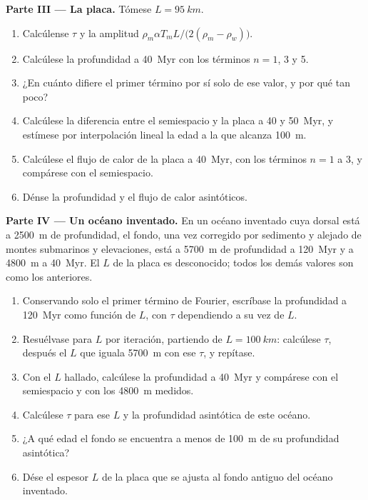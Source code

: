 \begin{problem}
\medskip\noindent\textbf{Parte III --- La placa.} Tómese $L = \qty{95}{km}$.
\begin{enumerate}[resume]
  \item Calcúlense $\tau$ y la amplitud $\rho_m\alpha T_mL/\bigl(2(\rho_m -
        \rho_w)\bigr)$.
  \item Calcúlese la profundidad a \qty{40}{Myr} con los términos $n = 1$, 3 y 5.
  \item ¿En cuánto difiere el primer término por sí solo de ese valor, y por qué tan
        poco?
  \item Calcúlese la diferencia entre el semiespacio y la placa a 40 y
        \qty{50}{Myr}, y estímese por interpolación lineal la edad a la que
        alcanza \qty{100}{m}.
  \item Calcúlese el flujo de calor de la placa a \qty{40}{Myr}, con los términos
        $n = 1$ a 3, y compárese con el semiespacio.
  \item Dénse la profundidad y el flujo de calor asintóticos.
\end{enumerate}

\medskip\noindent\textbf{Parte IV --- Un océano inventado.} En un océano inventado
cuya dorsal está a \qty{2500}{m} de profundidad, el fondo, una vez corregido por sedimento
y alejado de montes submarinos y elevaciones, está a \qty{5700}{m} de profundidad a \qty{120}{Myr} y
a \qty{4800}{m} a \qty{40}{Myr}. El $L$ de la placa es desconocido; todos los demás valores
son como los anteriores.
\begin{enumerate}[resume]
  \item Conservando solo el primer término de Fourier, escríbase la profundidad a
        \qty{120}{Myr} como función de $L$, con $\tau$ dependiendo a su vez de
        $L$.
  \item Resuélvase para $L$ por iteración, partiendo de $L = \qty{100}{km}$:
        calcúlese $\tau$, después el $L$ que iguala \qty{5700}{m} con ese
        $\tau$, y repítase.
  \item Con el $L$ hallado, calcúlese la profundidad a \qty{40}{Myr} y compárese
        con el semiespacio y con los \qty{4800}{m} medidos.
  \item Calcúlese $\tau$ para ese $L$ y la profundidad asintótica de este océano.
  \item ¿A qué edad el fondo se encuentra a menos de \qty{100}{m} de su
        profundidad asintótica?
  \item Dése el espesor $L$ de la placa que se ajusta al fondo antiguo del
        océano inventado.
\end{enumerate}
\end{problem}

